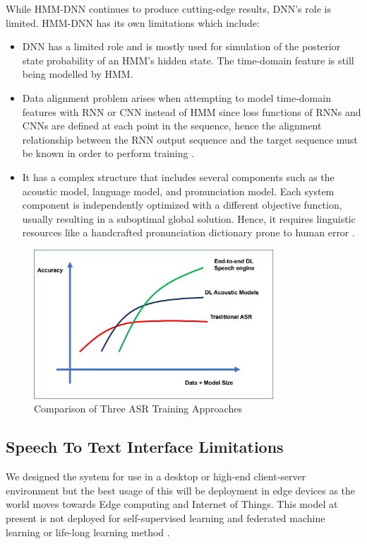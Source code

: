While HMM-DNN continues to produce cutting-edge results, DNN's role is limited. HMM-DNN has its own limitations which include:
\begin{itemize}
    \item DNN has a limited role and is mostly used for simulation of the posterior state probability of an HMM's hidden state. The time-domain feature is still being modelled by HMM.
    \item Data alignment problem arises when attempting to model time-domain features with RNN or CNN instead of HMM since loss functions of RNNs and CNNs are defined at each point in the sequence, hence the alignment relationship between the RNN output sequence and the target sequence must be known in order to perform training \cite{backstrom_introduction_2022}.
    \item It has a complex structure that includes several components such as the acoustic model, language model, and pronunciation model. Each system component is independently optimized with a different objective function, usually resulting in a suboptimal global solution. Hence, it requires linguistic resources like a handcrafted pronunciation dictionary prone to human error \cite{hussein_arabic_2022}. 
    
\end{itemize}

\begin{figure}[htb]
    \centering
    \includegraphics[width=0.8\textwidth]{img/ComparisonASRMODELS.png}
    \caption{Comparison of Three ASR Training Approaches} %
    \label{fig:comparison-all-asr-approach}
\end{figure}

\subsection{Speech To Text Interface Limitations}
We designed the system for use in a desktop or high-end client-server environment but the best usage of this will be deployment in edge devices as the world moves towards Edge computing and Internet of Things. This model at present is not deployed for self-supervised learning and federated machine learning or life-long learning method \cite{dautume_episodic_2019} \cite{chang_towards_2021}.

